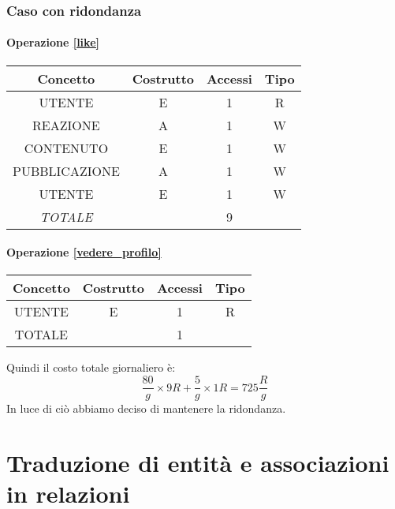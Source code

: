 \documentclass[a4paper,12pt]{report}
\begin{document}
\subsubsection{Caso con ridondanza}
\begin{table}[h]
  \paragraph{Operazione \ref{like}\newline}
\begin{tabular}{|c|c|c|c|}
\hline
Concetto        & Costrutto & Accessi & Tipo \\ \hline
UTENTE          & E         & 1       & R    \\ \hline
REAZIONE        & A         & 1       & W    \\ \hline
CONTENUTO       & E         & 1       & W    \\ \hline
PUBBLICAZIONE   & A         & 1       & W    \\ \hline 
UTENTE          & E         & 1       & W    \\ \hline
\textit{TOTALE} &           & 9       &      \\ \hline
\end{tabular}
\end{table}

\begin{table}[H]
  \paragraph{Operazione \ref{vedere_profilo}\newline}
\begin{tabular}{|c|c|c|c|}
\hline
Concetto & Costrutto & Accessi & Tipo \\ \hline
UTENTE   & E         & 1       & R    \\ \hline
TOTALE   &           & 1       &      \\ \hline
\end{tabular}
\end{table}
Quindi il costo totale giornaliero è:
\begin{equation}
  \frac{80} g \times 9 R + \frac{5} {g} \times 1 R = 725 \frac{R} g 
\end{equation}
In luce di ciò abbiamo deciso di mantenere la ridondanza.

\section{Traduzione di entità e associazioni in relazioni}
\end{document}
